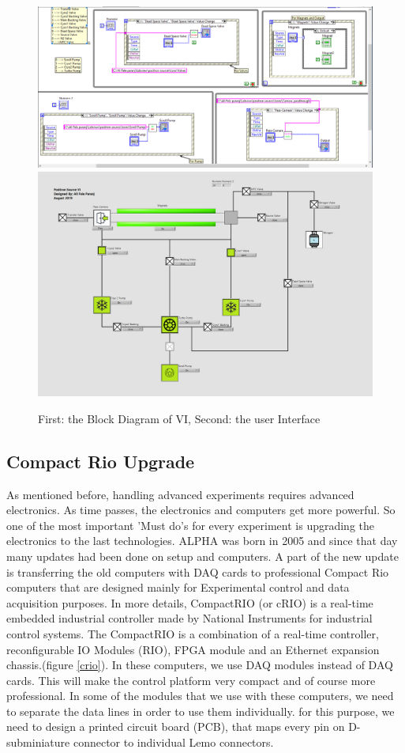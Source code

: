 \documentclass[12pt,a4paper]{article}
\begin{document}
\begin{figure}[h]
\centering
\includegraphics[scale=0.29]{Block-Diagram}
\includegraphics[scale=0.22]{InterFace}
\caption{First: the Block Diagram of VI, Second: the user Interface}
\label{VI}
\end{figure}

\subsection{Compact Rio Upgrade}
As mentioned before, handling advanced experiments requires advanced electronics. As time passes, the electronics and computers get more powerful. So one of the most important 'Must do's for every experiment is upgrading the electronics to the last technologies. ALPHA was born in 2005 and since that day many updates had been done on setup and computers. A part of the new update is transferring the old computers with DAQ cards to professional Compact Rio computers that are designed mainly for Experimental control and data acquisition purposes. In more details, CompactRIO (or cRIO) is a real-time embedded industrial controller made by National Instruments for industrial control systems. The CompactRIO is a combination of a real-time controller, reconfigurable IO Modules (RIO), FPGA module and an Ethernet expansion chassis.(figure \ref{crio}). In these computers, we use DAQ modules instead of DAQ cards. This will make the control platform very compact and of course more professional. In some of the modules that we use with these computers, we need to separate the data lines in order to use them individually. for this purpose, we need to design a printed circuit board (PCB), that maps every pin on D-subminiature connector to individual Lemo connectors.
\end{document}
